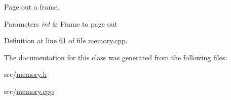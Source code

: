 Page out a frame. 


\begin{DoxyParams}{Parameters}
{\em int} & Frame to page out \\
\hline
\end{DoxyParams}


Definition at line \hyperlink{memory_8cpp_source_l00061}{61} of file \hyperlink{memory_8cpp_source}{memory.\+cpp}.



The documentation for this class was generated from the following files\+:\begin{DoxyCompactItemize}
\item 
src/\hyperlink{memory_8h}{memory.\+h}\item 
src/\hyperlink{memory_8cpp}{memory.\+cpp}\end{DoxyCompactItemize}
